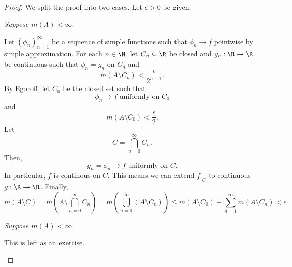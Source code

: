 \documentclass[pmath451]{subfiles}
\begin{document}
    \begin{proof}
        We split the proof into two cases. Let $\epsilon>0$ be given.

        \begin{case}
            \textit{Suppose $m\left( A \right)<\infty$.}

            Let $\left( \phi_{n} \right)^{\infty}_{n=1}$ be a sequence of simple functions such that $\phi_n\to f$ pointwise by simple approximation. For each $n\in\N$, let $C_n\subseteq\R$ be closed and $g_n:\R\to\R$ be continuous such that $\phi_n=g_n$ on $C_n$ and
            \begin{equation*}
                m\left( A\setminus C_n \right) < \frac{\epsilon}{2^{n+1}}.
            \end{equation*}
            By Egoroff, let $C_0$ be the closed set such that 
            \begin{equation*}
                \text{$\phi_n\to f$ uniformly on $C_0$}
            \end{equation*}
            and
            \begin{equation*}
                m\left( A\setminus C_0 \right) < \frac{\epsilon}{2}.
            \end{equation*}
            Let
            \begin{equation*}
                C = \bigcap^{\infty}_{n=0} C_n.
            \end{equation*}
            Then,
            \begin{equation*}
                g_n = \phi_n \to f\text{ uniformly on }C.
            \end{equation*}
            In particular, $f$ is continous on $C$. This means we can extend $f|_C$ to continuous $g:\R\to\R$. Finally,
            \begin{equation*}
                m\left( A\setminus C \right) = m\left( A\setminus\bigcap^{\infty}_{n=0}C_n \right) = m\left( \bigcup^{\infty}_{n=0}\left( A\setminus C_n \right) \right) \leq m\left( A\setminus C_0 \right) + \sum^{\infty}_{n=1}m\left( A\setminus C_n \right) < \epsilon.
            \end{equation*}
        \end{case}

        \begin{case}
            \textit{Suppose $m\left( A \right)<\infty$.}

            This is left as an exercise.
        \end{case}
    \end{proof}
    
    
    
    
    
    
    
    
    
    
    
    
    
    
    
    
    
    
    
    
    
    
    
    
    
    
    
    
    
    
    
\end{document}
